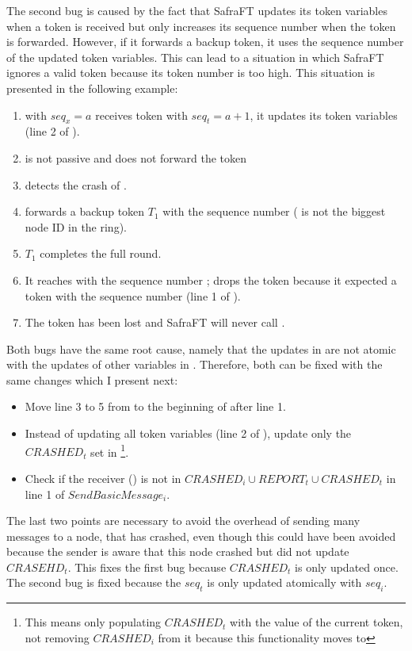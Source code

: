 The second bug is caused by the fact that SafraFT updates its token variables when a token is received but only increases its sequence number when the token is forwarded.
However, if it forwards a backup token, it uses the sequence number of the updated token variables.
This can lead to a situation in which SafraFT ignores a valid token because its token number is too high. This situation is presented in the following example:

\begin{enumerate}
	\item {} with $seq_x = a$ receives token  with $seq_t=a+1$, it updates its token variables (line 2 of ).
	\item {} is not passive and does not forward the token
	\item {} detects the crash of .
	\item {} forwards a backup token $T_1$ with the sequence number  ( is not the biggest node ID in the ring).
	\item $T_1$ completes the full round.
	\item It reaches  with the sequence number ;  drops the token because it expected a token with the sequence number  (line 1 of ).
	\item The token has been lost and SafraFT will never call .
\end{enumerate}

Both bugs have the same root cause, namely that the updates in  are not atomic with the updates of other variables in .
Therefore, both can be fixed with the same changes which I present next:
\begin{itemize}
	\item Move line 3 to 5 from  to the beginning of  after line 1.
	\item Instead of updating all token variables (line 2 of ), update only the $CRASHED_t$ set in \footnote{This means only populating $CRASHED_t$ with the value of the current token, not removing $CRASHED_i$ from it because this functionality moves to }.
	\item Check if the receiver () is not in $CRASHED_i \cup REPORT_t \cup CRASHED_t$ in line 1 of $SendBasicMessage_i$.
\end{itemize}

The last two points are necessary to avoid the overhead of sending many messages to a node, that has crashed, even though this could have been avoided because the sender is aware that this node crashed but did not update $CRASEHD_t$.
This fixes the first bug because $CRASHED_t$ is only updated once.
The second bug is fixed because the $seq_t$ is only updated atomically with $seq_i$.